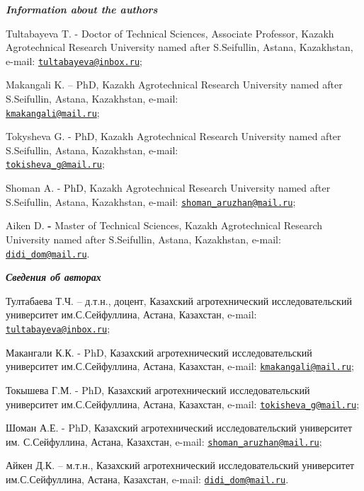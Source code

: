 \begin{authorinfo}
\hspace{1em}\emph{{\bfseries Information about the authors}}

Tultabayeva T. - Doctor of Technical Sciences, Associate Professor,
Kazakh Agrotechnical Research University named after S.Seifullin,
Astana, Kazakhstan, e-mail:
\href{mailto:tultabayeva@inbox.ru}{\nolinkurl{tultabayeva@inbox.ru}};

Makangali K. -- PhD, Kazakh Agrotechnical Research University named
after S.Seifullin, Astana, Kazakhstan, e-mail:\\
\href{mailto:kmakangali@mail.ru}{\nolinkurl{kmakangali@mail.ru}};

Tokysheva G. - PhD, Kazakh Agrotechnical Research University named after
S.Seifullin, Astana, Kazakhstan, e-mail:\\
\href{mailto:tokisheva_g@mail.ru}{\nolinkurl{tokisheva\_g@mail.ru}};

Shoman A. - PhD, Kazakh Agrotechnical Research University named after
S.Seifullin, Astana, Kazakhstan, e-mail:
\href{mailto:shoman_aruzhan@mail.ru}{\nolinkurl{shoman\_aruzhan@mail.ru}};

Aiken D. {\bfseries -} Master of Technical Sciences, Kazakh Agrotechnical
Research University named after S.Seifullin, Astana, Kazakhstan, e-mail:
\href{mailto:didi_dom@mail.ru}{\nolinkurl{didi\_dom@mail.ru}}.

\hspace{1em}\emph{{\bfseries Сведения об авторах}}

Тултабаева Т.Ч. -- д.т.н., доцент, Казахский агротехнический
исследовательский университет им.С.Сейфуллина, Астана, Казахстан,
e-mail:
\href{mailto:tultabayeva@inbox.ru}{\nolinkurl{tultabayeva@inbox.ru}};

Макангали К.К. - PhD, Казахский агротехнический исследовательский
университет им.С.Сейфуллина, Астана, Казахстан, e-mail:
\href{mailto:kmakangali@mail.ru}{\nolinkurl{kmakangali@mail.ru}};

Токышева Г.М. - PhD, Казахский агротехнический исследовательский
университет им.С.Сейфуллина, Астана, Казахстан, e-mail:
\href{mailto:tokisheva_g@mail.ru}{\nolinkurl{tokisheva\_g@mail.ru}};

Шоман А.Е. - PhD, Казахский агротехнический исследовательский
университет им. С.Сейфуллина, Астана, Казахстан, e-mail:
\href{mailto:shoman_aruzhan@mail.ru}{\nolinkurl{shoman\_aruzhan@mail.ru}};

Айкен Д.К. -- м.т.н., Казахский агротехнический исследовательский
университет им.С.Сейфуллина, Астана, Казахстан, e-mail:
\href{mailto:didi_dom@mail.ru}{\nolinkurl{didi\_dom@mail.ru}}.
\end{authorinfo}
